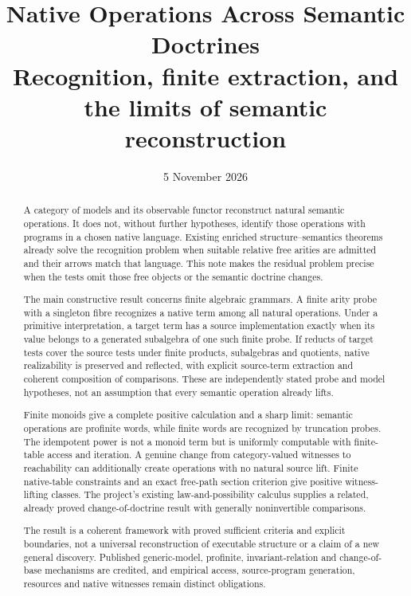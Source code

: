 \documentclass[11pt]{article}
\title{Native Operations Across Semantic Doctrines\\
\large Recognition, finite extraction, and the limits of semantic reconstruction}
\author{}\date{5 November 2026}
\theoremstyle{definition}
\theoremstyle{remark}
\begin{document}
\maketitle
\begin{abstract}
A category of models and its observable functor reconstruct natural semantic
operations. It does not, without further hypotheses, identify those operations
with programs in a chosen native language. Existing enriched
structure--semantics theorems already solve the recognition problem when
suitable relative free arities are admitted and their arrows match that
language. This note makes the residual problem precise when the tests omit
those free objects or the semantic doctrine changes.

The main constructive result concerns finite algebraic grammars. A finite
arity probe with a singleton fibre recognizes a native term among all natural
operations. Under a primitive interpretation, a target term has a source
implementation exactly when its value belongs to a generated subalgebra of
one such finite probe. If reducts of target tests cover the source tests under
finite products, subalgebras and quotients, native realizability is preserved
and reflected, with explicit source-term extraction and coherent composition
of comparisons. These are independently stated probe and model hypotheses,
not an assumption that every semantic operation already lifts.

Finite monoids give a complete positive calculation and a sharp limit:
semantic operations are profinite words, while finite words are recognized by
truncation probes. The idempotent power is not a monoid term but is uniformly
computable with finite-table access and iteration. A genuine change from
category-valued witnesses to reachability can additionally create operations
with no natural source lift. Finite native-table constraints and an exact
free-path section criterion give positive witness-lifting classes. The
project's existing law-and-possibility calculus supplies a related, already
proved change-of-doctrine result with generally noninvertible comparisons.

The result is a coherent framework with proved sufficient criteria and
explicit boundaries, not a universal reconstruction of executable structure
or a claim of a new general discovery. Published generic-model,
profinite, invariant-relation and change-of-base mechanisms are credited,
and empirical access, source-program generation, resources and native
witnesses remain distinct obligations.
\end{abstract}
\tableofcontents
\end{document}
